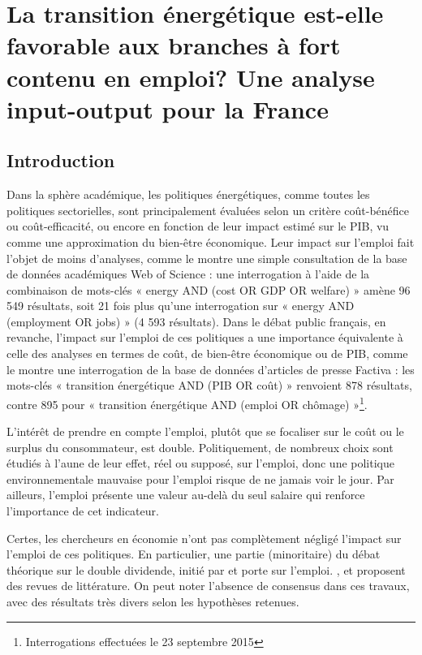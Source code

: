 \chapter{La transition énergétique est-elle favorable aux branches à fort contenu en emploi? Une analyse input-output pour la France} \label{chap:TE_Emploi}

\section{Introduction}
Dans la sphère académique, les politiques énergétiques, comme toutes les politiques sectorielles, sont principalement évaluées selon un critère coût-bénéfice ou coût-efficacité, ou encore en fonction de leur impact estimé sur le PIB, vu comme une approximation du bien-être économique. Leur impact sur l’emploi fait l’objet de moins d’analyses, comme le montre une simple consultation de la base de données académiques Web of Science : une interrogation à l’aide de la combinaison de mots-clés « energy AND (cost OR GDP OR welfare) » amène 96 549 résultats, soit 21 fois plus qu’une interrogation sur « energy AND (employment OR jobs) » (4 593 résultats). Dans le débat public français, en revanche, l’impact sur l’emploi de ces politiques a une importance équivalente à celle des analyses en termes de coût, de bien-être économique ou de PIB, comme le montre une interrogation de la base de données d’articles de presse Factiva : les mots-clés « transition énergétique AND (PIB OR coût) » renvoient 878 résultats, contre 895 pour « transition énergétique AND (emploi OR chômage) »\footnote{Interrogations effectuées le 23 septembre 2015}.

L’intérêt de prendre en compte l’emploi, plutôt que se focaliser sur le coût ou le surplus du consommateur, est double. Politiquement, de nombreux choix sont étudiés à l’aune de leur effet, réel ou supposé, sur l’emploi, donc une politique environnementale mauvaise pour l’emploi risque de ne jamais voir le jour. Par ailleurs, l’emploi présente une valeur au-delà du seul salaire \citep{Clark2015} qui renforce l’importance de cet indicateur.

Certes, les chercheurs en économie n’ont pas complètement négligé l’impact sur l’emploi de ces politiques. En particulier, une partie (minoritaire) du débat théorique sur le double dividende, initié par \citet{Pearce1991} et \citet{Goulder1994} porte sur l’emploi. \citet{Bosquet2000}, \citet{Chiroleu-Assouline2001} et \citet{Patuelli2005} proposent des revues de littérature. On peut noter l’absence de consensus dans ces travaux, avec des résultats très divers selon les hypothèses retenues. 


